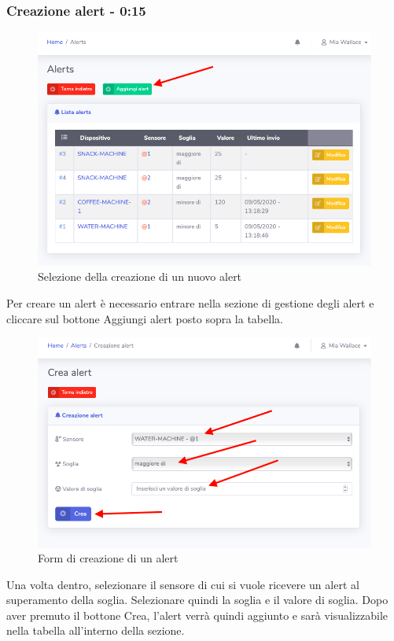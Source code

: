 	\subsubsection{Creazione alert - 0:15}
	\begin{figure}[H]
		\centering
		\includegraphics[scale=0.600]{res/images/mod/selCreazAlert.png}
		\caption{Selezione della creazione di un nuovo alert}
	\end{figure}
		Per creare un alert è necessario entrare nella sezione di gestione degli alert e cliccare sul bottone Aggiungi alert posto sopra la tabella.
		\begin{figure}[H]
		\centering
		\includegraphics[scale=0.600]{res/images/mod/creazAlert.png}
		\caption{Form di creazione di un alert}
	\end{figure}
		Una volta dentro, selezionare il sensore di cui si vuole ricevere un alert al superamento della soglia. Selezionare quindi la soglia e il valore di soglia.
		Dopo aver premuto il bottone Crea, l'alert verrà quindi aggiunto e sarà visualizzabile nella tabella all'interno della sezione.

